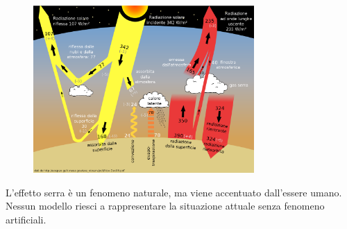 \documentclass[a4paper]{article}
\begin{document}
\begin{center}
\begin{figure}[h]
    \centering
    \includegraphics[width=0.75\textwidth]{./serra.svg.png}
\end{figure}
\end{center}

L'effetto serra è un fenomeno naturale, ma viene accentuato dall'essere umano.
Nessun modello riesci a rappresentare la situazione attuale senza fenomeno artificiali.
\end{document}
